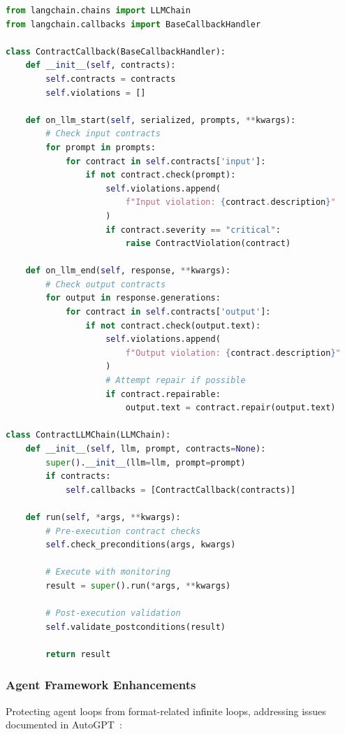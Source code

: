 \documentclass[11pt]{article}
\begin{document}
\begin{lstlisting}[language=Python, caption={Contract-aware LangChain}]
from langchain.chains import LLMChain
from langchain.callbacks import BaseCallbackHandler

class ContractCallback(BaseCallbackHandler):
    def __init__(self, contracts):
        self.contracts = contracts
        self.violations = []
    
    def on_llm_start(self, serialized, prompts, **kwargs):
        # Check input contracts
        for prompt in prompts:
            for contract in self.contracts['input']:
                if not contract.check(prompt):
                    self.violations.append(
                        f"Input violation: {contract.description}"
                    )
                    if contract.severity == "critical":
                        raise ContractViolation(contract)
    
    def on_llm_end(self, response, **kwargs):
        # Check output contracts
        for output in response.generations:
            for contract in self.contracts['output']:
                if not contract.check(output.text):
                    self.violations.append(
                        f"Output violation: {contract.description}"
                    )
                    # Attempt repair if possible
                    if contract.repairable:
                        output.text = contract.repair(output.text)

class ContractLLMChain(LLMChain):
    def __init__(self, llm, prompt, contracts=None):
        super().__init__(llm=llm, prompt=prompt)
        if contracts:
            self.callbacks = [ContractCallback(contracts)]
    
    def run(self, *args, **kwargs):
        # Pre-execution contract checks
        self.check_preconditions(args, kwargs)
        
        # Execute with monitoring
        result = super().run(*args, **kwargs)
        
        # Post-execution validation
        self.validate_postconditions(result)
        
        return result
\end{lstlisting}

\subsubsection{Agent Framework Enhancements}

Protecting agent loops from format-related infinite loops, addressing issues documented in AutoGPT~\cite{githubautogpt1994}:
\end{document}
